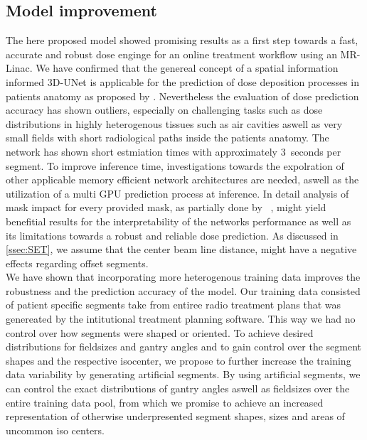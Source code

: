 \subsection{Model improvement}

The here proposed model showed promising results as a first step towards a fast, accurate and robust dose enginge for an online treatment workflow using an MR-Linac. 
We have confirmed that the genereal concept of a spatial information informed 3D-UNet is applicable for the prediction of dose deposition processes in patients anatomy as proposed by \citeauthor{kontaxis_deepdose_2020}.
Nevertheless the evaluation of dose prediction accuracy has shown outliers, especially on challenging tasks such as dose distributions in highly heterogenous tissues such as air cavities aswell as very small fields with short radiological paths inside the patients anatomy.  
The network has shown short estmiation times with approximately 3~seconds per segment. 
To improve inference time, investigations towards the expolration of other applicable memory efficient network architectures are needed, aswell as the utilization of a multi GPU prediction process at inference.
In detail analysis of mask impact for every provided mask, as partially done by \citeauthor{kontaxis_deepdose_2020}~\cite{kontaxis_deepdose_2020}, might yield benefitial results for the interpretability of the networks performance as well as its limitations towards a robust and reliable dose prediction. 
As discussed in \autoref{ssec:SET}, we assume that the center beam line distance, might have a negative effects regarding offset segments.\\
We have shown that incorporating more heterogenous training data improves the robustness and the prediction accuracy of the model.
Our training data consisted of patient specific segments take from entiree radio treatment plans that was genereated by the intitutional treatment planning software. 
This way we had no control over how segments were shaped or oriented.
To achieve desired distributions for fieldsizes and gantry angles and to gain control over the segment shapes and the respective isocenter, we propose to further increase the training data variability by generating artificial segments.
By using artificial segments, we can control the exact distributions of gantry angles aswell as fieldsizes over the entire training data pool, from which we promise to achieve an increased representation of otherwise underpresented segment shapes, sizes and areas of uncommon iso centers.\\
